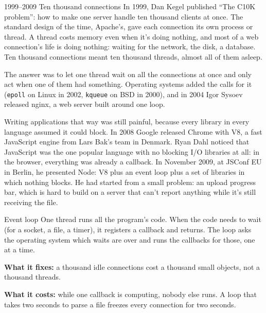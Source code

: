 \begin{history}{1999--2009 \textperiodcentered{} Ten thousand connections}
In 1999, Dan Kegel published ``The C10K problem'': how to make one server handle
ten thousand clients at once. The standard design of the time, Apache's, gave
each connection its own process or thread. A thread costs memory even when it's
doing nothing, and most of a web connection's life is doing nothing: waiting
for the network, the disk, a database. Ten thousand connections meant ten
thousand threads, almost all of them asleep.

The answer was to let one thread wait on all the connections at once and only
act when one of them had something. Operating systems added the calls for it
(\texttt{epoll} on Linux in 2002, \texttt{kqueue} on BSD in 2000), and in 2004
Igor Sysoev released nginx, a web server built around one loop.

Writing applications that way was still painful, because every library in
every language assumed it could block. In 2008 Google released Chrome with V8,
a fast JavaScript engine from Lars Bak's team in Denmark. Ryan Dahl noticed
that JavaScript was the one popular language with no blocking I/O libraries at
all: in the browser, everything was already a callback. In November 2009, at
JSConf EU in Berlin, he presented Node: V8 plus an event loop plus a set of
libraries in which nothing blocks. He had started from a small problem: an
upload progress bar, which is hard to build on a server that can't report
anything while it's still receiving the file.
\end{history}

\begin{concept}{Event loop}
One thread runs all the program's code. When the code needs to wait (for a
socket, a file, a timer), it registers a callback and returns. The loop asks
the operating system which waits are over and runs the callbacks for those,
one at a time.

\textbf{What it fixes:} a thousand idle connections cost a thousand small
objects, not a thousand threads.

\textbf{What it costs:} while one callback is computing, nobody else runs. A
loop that takes two seconds to parse a file freezes every connection for two
seconds.
\end{concept}

